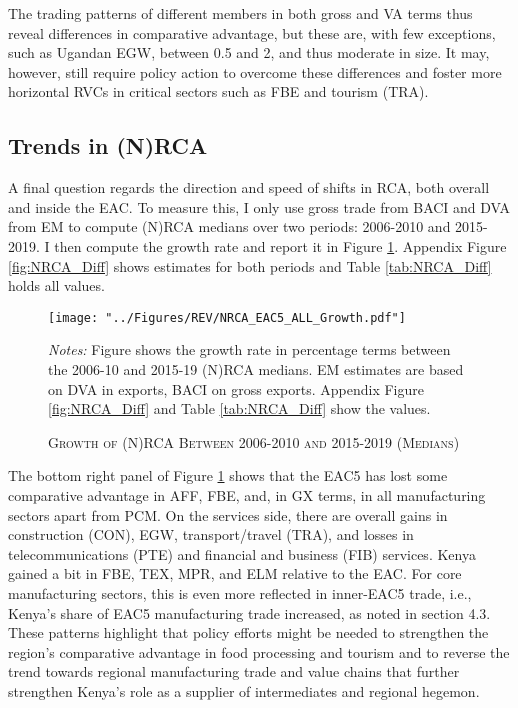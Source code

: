 \documentclass[a4paper]{article}
\begin{document}
The trading patterns of different members in both gross and VA terms thus reveal differences in comparative advantage, but these are, with few exceptions, such as Ugandan EGW, between 0.5 and 2, and thus moderate in size. It may, however, still require policy action to overcome these differences and foster more horizontal RVCs in critical sectors such as FBE and tourism (TRA). 

\subsection{Trends in (N)RCA}

A final question regards the direction and speed of shifts in RCA, both overall and inside the EAC. To measure this, I only use gross trade from BACI and DVA from EM to compute (N)RCA medians over two periods: 2006-2010 and 2015-2019. I then compute the growth rate and report it in Figure \ref{fig:NRCA_GR}. Appendix Figure \ref{fig:NRCA_Diff} shows estimates for both periods and Table \ref{tab:NRCA_Diff} holds all values. 

\begin{figure}[h!]
\centering
\caption{\label{fig:NRCA_GR}\textsc{Growth of (N)RCA Between 2006-2010 and 2015-2019 (Medians)}}
\texttt{[image: "../Figures/REV/NRCA\_EAC5\_ALL\_Growth.pdf"]} \\ \raggedright
\scriptsize
\emph{Notes:} Figure shows the growth rate in percentage terms between the 2006-10 and 2015-19 (N)RCA medians. EM estimates are based on DVA in exports, BACI on gross exports. Appendix Figure \ref{fig:NRCA_Diff} and Table \ref{tab:NRCA_Diff} show the values. 
\end{figure}
\FloatBarrier

The bottom right panel of Figure \ref{fig:NRCA_GR} shows that the EAC5 has lost some comparative advantage in AFF, FBE, and, in GX terms, in all manufacturing sectors apart from PCM. On the services side, there are overall gains in construction (CON), EGW, transport/travel (TRA), and losses in telecommunications (PTE) and financial and business (FIB) services. Kenya gained a bit in FBE, TEX, MPR, and ELM relative to the EAC. For core manufacturing sectors, this is even more reflected in inner-EAC5 trade, i.e., Kenya's share of EAC5 manufacturing trade increased, as noted in section 4.3. These patterns highlight that policy efforts might be needed to strengthen the region's comparative advantage in food processing and tourism and to reverse the trend towards regional manufacturing trade and value chains that further strengthen Kenya's role as a supplier of intermediates and regional hegemon. 
\end{document}

